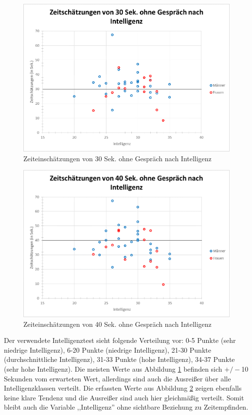 \documentclass{Paper}
\begin{document}

\begin{figure}[H]
	\centering
	\includegraphics[scale=0.7]{../Diagramme/scatterPre/30ohne_intelligenz.png}
	\caption{Zeiteinschätzungen von 30 Sek. ohne Gespräch nach Intelligenz}
	\label{img:intell30ohne}
\end{figure}
\begin{figure}[H]
	\centering
	\includegraphics[scale=0.7]{../Diagramme/scatterPre/40ohne_intelligenz.png}
	\caption{Zeiteinschätzungen von 40 Sek. ohne Gespräch nach Intelligenz}
	\label{img:intell40ohne}
\end{figure}

Der verwendete Intelligenztest sieht folgende Verteilung vor: 0-5 Punkte (sehr niedrige Intelligenz), 6-20 Punkte (niedrige Intelligenz), 21-30 Punkte (durchschnittliche Intelligenz), 31-33 Punkte (hohe Intelligenz), 34-37 Punkte (sehr hohe Intelligenz). Die meisten Werte aus Abbildung \ref{img:intell30ohne} befinden sich  $+/-$10 Sekunden vom erwarteten Wert, allerdings sind auch die Ausreißer über alle Intelligenzklassen verteilt. Die erfassten Werte aus Abbildung \ref{img:intell40ohne} zeigen ebenfalls keine klare Tendenz und die Ausreißer sind auch hier gleichmäßig verteilt.  
Somit bleibt auch die Variable ,,Intelligenz'' ohne sichtbare Beziehung zu Zeitempfinden.
\end{document}
